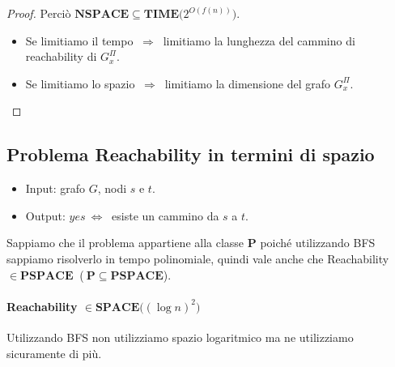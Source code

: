 \documentclass[a4paper]{article}
\theoremstyle{definition}
\newcommand{\p}{\mathbf{P}}
\newcommand{\Space}{\mathbf{SPACE}}
\newcommand{\pspace}{\mathbf{PSPACE}}
\newcommand{\nspace}{\mathbf{NSPACE}}
\begin{document}
\begin{proof}
				Perciò $ \nspace \subseteq \mathbf{TIME}\big( 2^{O(f(n))} \big) $.
				\begin{itemize}
					\item Se limitiamo il tempo $ \ \Rightarrow\ $ limitiamo la lunghezza del cammino di reachability di $ G_x^{\Pi} $.
					\item Se limitiamo lo spazio $ \ \Rightarrow\ $ limitiamo la dimensione del grafo $ G_x^{\Pi} $.
				\end{itemize}
			\end{proof}
		
		\subsection{Problema Reachability in termini di spazio}
			\begin{itemize}
				\item Input: grafo $ G $, nodi $ s $ e $ t $.
				\item Output: $ yes\ \Leftrightarrow\ $ esiste un cammino da $ s $ a $ t $.
			\end{itemize}
			Sappiamo che il problema appartiene alla classe $ \p $ poiché utilizzando BFS sappiamo risolverlo in tempo polinomiale, quindi vale anche che Reachability $ \in \pspace \ $ ($ \ \p\subseteq\pspace  $).
			
			\paragraph{Reachability $ \in \Space\big((\log n)^2\big) $} Utilizzando BFS non utilizziamo spazio logaritmico ma ne utilizziamo sicuramente di più. 
			
\end{document}
